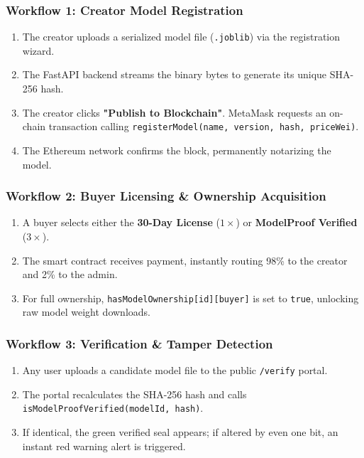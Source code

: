 \documentclass[11pt,a4paper]{article}
\begin{document}
\subsubsection{Workflow 1: Creator Model Registration}
\begin{enumerate}[leftmargin=1.5em]
    \item The creator uploads a serialized model file (\texttt{.joblib}) via the registration wizard.
    \item The FastAPI backend streams the binary bytes to generate its unique SHA-256 hash.
    \item The creator clicks \textbf{"Publish to Blockchain"}. MetaMask requests an on-chain transaction calling \texttt{registerModel(name, version, hash, priceWei)}.
    \item The Ethereum network confirms the block, permanently notarizing the model.
\end{enumerate}

\subsubsection{Workflow 2: Buyer Licensing \& Ownership Acquisition}
\begin{enumerate}[leftmargin=1.5em]
    \item A buyer selects either the \textbf{30-Day License} ($1\times$) or \textbf{ModelProof Verified\texttrademark} ($3\times$).
    \item The smart contract receives payment, instantly routing 98\% to the creator and 2\% to the admin.
    \item For full ownership, \texttt{hasModelOwnership[id][buyer]} is set to \texttt{true}, unlocking raw model weight downloads.
\end{enumerate}

\subsubsection{Workflow 3: Verification \& Tamper Detection}
\begin{enumerate}[leftmargin=1.5em]
    \item Any user uploads a candidate model file to the public \texttt{/verify} portal.
    \item The portal recalculates the SHA-256 hash and calls \texttt{isModelProofVerified(modelId, hash)}.
    \item If identical, the green verified seal appears; if altered by even one bit, an instant red warning alert is triggered.
\end{enumerate}
\end{document}
